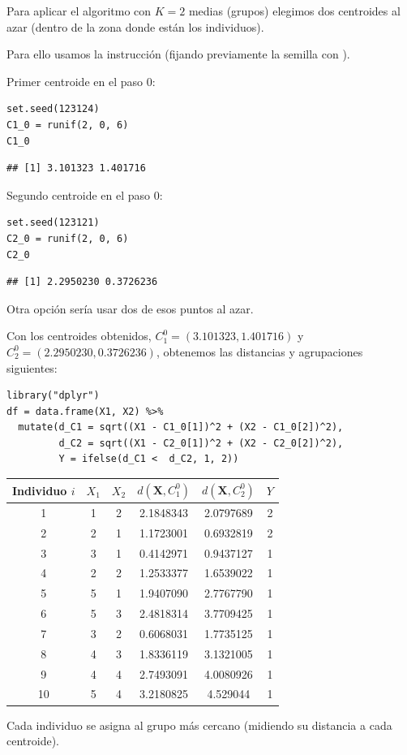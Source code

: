 Para aplicar el algoritmo con $K=2$ medias (grupos) elegimos dos centroides al azar (dentro de la zona donde están los individuos).

Para ello usamos la instrucción  (fijando previamente la semilla con ).

Primer centroide en el paso 0:
\begin{lstlisting}
set.seed(123124)
C1_0 = runif(2, 0, 6)
C1_0
\end{lstlisting}
\begin{verbatim}
## [1] 3.101323 1.401716
\end{verbatim}
Segundo centroide en el paso 0:
\begin{lstlisting}
set.seed(123121)
C2_0 = runif(2, 0, 6)
C2_0
\end{lstlisting}
\begin{verbatim}
## [1] 2.2950230 0.3726236
\end{verbatim}
Otra opción sería usar dos de esos puntos al azar.

Con los centroides obtenidos, $C_1^0=(3.101323, 1.401716)$ y $C_2^0=(2.2950230,0.3726236)$, obtenemos las distancias y agrupaciones siguientes:
\begin{lstlisting}
library("dplyr")
df = data.frame(X1, X2) %>%
  mutate(d_C1 = sqrt((X1 - C1_0[1])^2 + (X2 - C1_0[2])^2),
         d_C2 = sqrt((X1 - C2_0[1])^2 + (X2 - C2_0[2])^2),
         Y = ifelse(d_C1 <  d_C2, 1, 2))
\end{lstlisting}
\begin{center}
\begin{tabular}{c|cccc|c}
Individuo $i$ & $X_1$ & $X_2$ & $d(\mathbf{X},C_1^0)$ & $d(\mathbf{X},C_2^0)$ & $Y		$ \\ 
\hline 
1 & 1 & 2 & 2.1848343 & 2.0797689 & 2 \\ 
2 & 2 & 1 & 1.1723001 & 0.6932819 & 2 \\ 
3 & 3 & 1 & 0.4142971 & 0.9437127 & 1 \\ 
4 & 2 & 2 & 1.2533377 & 1.6539022 & 1 \\ 
5 & 5 & 1 & 1.9407090 & 2.7767790 & 1 \\ 
6 & 5 & 3 & 2.4818314 & 3.7709425 & 1 \\ 
7 & 3 & 2 & 0.6068031 & 1.7735125 & 1 \\ 
8 & 4 & 3 & 1.8336119 & 3.1321005 & 1 \\ 
9 & 4 & 4 & 2.7493091 & 4.0080926 & 1 \\ 
10 & 5 & 4 & 3.2180825 & 4.529044 & 1 \\ 
\hline 
\end{tabular} 
\end{center}
Cada individuo se asigna al grupo más cercano (midiendo su distancia a cada centroide).

